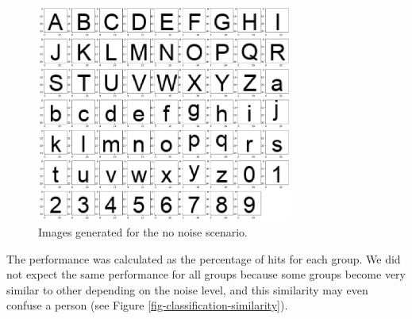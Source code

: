 \begin{figure}[!htb]
\centering\includegraphics[width=0.75\textwidth]{./images02/classification/no-noise.png}
\caption{Images generated for the no noise scenario.
\label{fig-classification-no-noise}}
\end{figure}

The performance was calculated as the percentage of hits for each group. We did not expect the same performance for all groups because some groups become very similar to other depending on the noise level, and this similarity may even confuse a person (see Figure \ref{fig-classification-similarity}).

